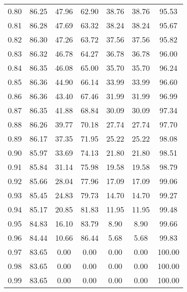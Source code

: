 \begin{tabular}{|c|c|c|c|c|c|c|}
      0.80 &     86.25 &     47.96 &      62.90 &   38.76 &      38.76 &         95.53 \\
      0.81 &     86.28 &     47.69 &      63.32 &   38.24 &      38.24 &         95.67 \\
      0.82 &     86.30 &     47.26 &      63.72 &   37.56 &      37.56 &         95.82 \\
      0.83 &     86.32 &     46.78 &      64.27 &   36.78 &      36.78 &         96.00 \\
      0.84 &     86.35 &     46.08 &      65.00 &   35.70 &      35.70 &         96.24 \\
      0.85 &     86.36 &     44.90 &      66.14 &   33.99 &      33.99 &         96.60 \\
      0.86 &     86.36 &     43.40 &      67.46 &   31.99 &      31.99 &         96.99 \\
      0.87 &     86.35 &     41.88 &      68.84 &   30.09 &      30.09 &         97.34 \\
      0.88 &     86.26 &     39.77 &      70.18 &   27.74 &      27.74 &         97.70 \\
      0.89 &     86.17 &     37.35 &      71.95 &   25.22 &      25.22 &         98.08 \\
      0.90 &     85.97 &     33.69 &      74.13 &   21.80 &      21.80 &         98.51 \\
      0.91 &     85.84 &     31.14 &      75.98 &   19.58 &      19.58 &         98.79 \\
      0.92 &     85.66 &     28.04 &      77.96 &   17.09 &      17.09 &         99.06 \\
      0.93 &     85.45 &     24.83 &      79.73 &   14.70 &      14.70 &         99.27 \\
      0.94 &     85.17 &     20.85 &      81.83 &   11.95 &      11.95 &         99.48 \\
      0.95 &     84.83 &     16.10 &      83.79 &    8.90 &       8.90 &         99.66 \\
      0.96 &     84.44 &     10.66 &      86.44 &    5.68 &       5.68 &         99.83 \\
      0.97 &     83.65 &      0.00 &       0.00 &    0.00 &       0.00 &        100.00 \\
      0.98 &     83.65 &      0.00 &       0.00 &    0.00 &       0.00 &        100.00 \\
      0.99 &     83.65 &      0.00 &       0.00 &    0.00 &       0.00 &        100.00 \\
\bottomrule
\end{tabular}
